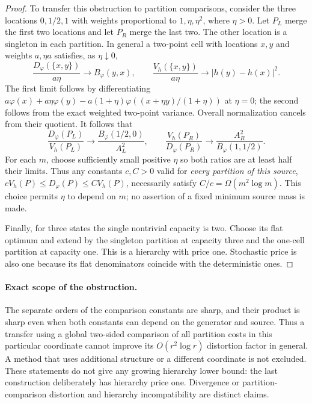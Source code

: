 \begin{proof}
To transfer this obstruction to partition comparisons, consider the
three locations $0,1/2,1$ with weights proportional to
$1,\eta,\eta^2$, where $\eta>0$. Let $P_L$ merge the first two
locations and let $P_R$ merge the last two. The other location is a
singleton in each partition. In general a two-point cell with locations
$x,y$ and weights $a,\eta a$ satisfies, as $\eta\downarrow0$,
\[
 \frac{D_\varphi(\{x,y\})}{a\eta}\longrightarrow B_\varphi(y,x),
 \qquad
 \frac{V_h(\{x,y\})}{a\eta}\longrightarrow
       |h(y)-h(x)|^2.
\]
The first limit follows by differentiating
$a\varphi(x)+a\eta\varphi(y)-a(1+\eta)
\varphi((x+\eta y)/(1+\eta))$ at $\eta=0$; the second follows from
the exact weighted two-point variance. Overall normalization cancels
from their quotient. It follows that
\[
 \frac{D_\varphi(P_L)}{V_h(P_L)}\longrightarrow
      \frac{B_\varphi(1/2,0)}{A_L^2},\qquad
 \frac{V_h(P_R)}{D_\varphi(P_R)}\longrightarrow
      \frac{A_R^2}{B_\varphi(1,1/2)}.
\]
For each $m$, choose sufficiently small positive $\eta$ so both ratios
are at least half their limits. Thus any constants $c,C>0$ valid for
\emph{every partition of this source},
$cV_h(P)\leq D_\varphi(P)\leq C V_h(P)$, necessarily satisfy
$C/c=\Omega(m^2\log m)$. This choice permits $\eta$ to depend on $m$;
no assertion of a fixed minimum source mass is made.

Finally, for three states the single nontrivial capacity is two. Choose
its flat optimum and extend by the singleton partition at capacity
three and the one-cell partition at capacity one. This is a hierarchy
with price one. Stochastic price is also one because its flat
denominators coincide with the deterministic ones.
\end{proof}

\paragraph{Exact scope of the obstruction.}
The separate orders of the comparison constants are sharp, and
their product is sharp even when both constants can depend on the
generator and source. Thus a transfer using a global two-sided
comparison of all partition costs in this particular coordinate cannot
improve its $O(r^2\log r)$ distortion factor in general. A method that
uses additional structure or a different coordinate is not excluded.
These statements do not give any growing hierarchy lower bound: the
last construction deliberately has hierarchy price one. Divergence or
partition-comparison distortion and hierarchy incompatibility are
distinct claims.
